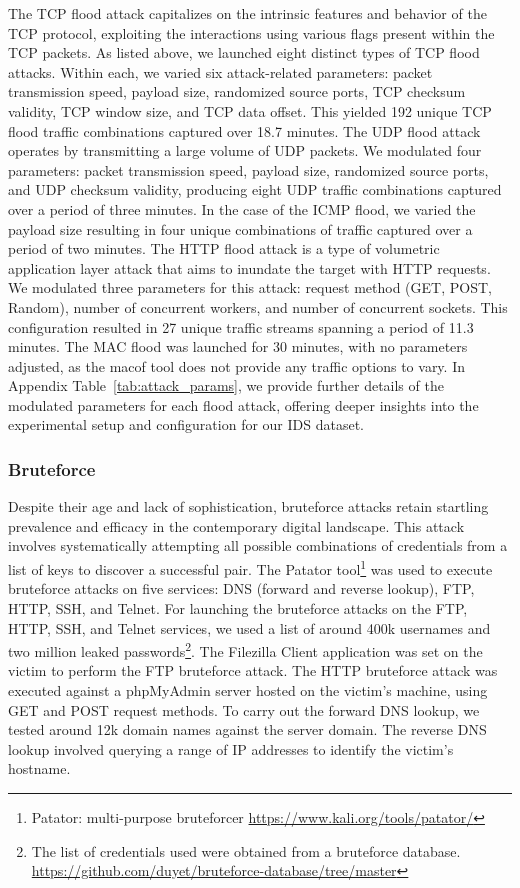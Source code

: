 \documentclass[lettersize,journal]{IEEEtran}
\begin{document}
The \ac{TCP} flood attack capitalizes on the intrinsic features and behavior of the \ac{TCP} protocol, exploiting the interactions using various flags present within the \ac{TCP} packets. As listed above, we launched eight distinct types of \ac{TCP} flood attacks. Within each, we varied six attack-related parameters: packet transmission speed, payload size, randomized source ports, \ac{TCP} checksum validity, \ac{TCP} window size, and \ac{TCP} data offset. This yielded 192 unique \ac{TCP} flood traffic combinations captured over 18.7 minutes. The UDP flood attack operates by transmitting a large volume of UDP packets. We modulated four parameters: packet transmission speed, payload size, randomized source ports, and UDP checksum validity, producing eight UDP traffic combinations captured over a period of three minutes. In the case of the \ac{ICMP} flood, we varied the payload size resulting in four unique combinations of traffic captured over a period of two minutes.  The \ac{HTTP} flood attack is a type of volumetric application layer attack that aims to inundate the target with \ac{HTTP} requests. We modulated three parameters for this attack: request method (GET, POST, Random), number of concurrent workers, and number of concurrent sockets. This configuration resulted in 27 unique traffic streams spanning a period of 11.3 minutes. The MAC flood was launched for 30 minutes, with no parameters adjusted, as the macof tool does not provide any traffic options to vary. In Appendix Table~\ref{tab:attack_params}, we provide further details of the modulated parameters for each flood attack, offering deeper insights into the experimental setup and configuration for our \ac{IDS} dataset. 


\subsubsection{Bruteforce}\label{sec:bruteforce}
Despite their age and lack of sophistication, bruteforce attacks retain startling prevalence and efficacy in the contemporary digital landscape. This attack involves systematically attempting all possible combinations of credentials from a list of keys to discover a successful pair. The Patator tool\footnote{Patator: multi-purpose bruteforcer \url{https://www.kali.org/tools/patator/}} was used to execute bruteforce attacks on five services: \ac{DNS} (forward and reverse lookup), \ac{FTP}, \ac{HTTP}, \ac{SSH}, and Telnet. For launching the bruteforce attacks on the \ac{FTP}, \ac{HTTP}, \ac{SSH}, and Telnet services, we used a list of around 400k usernames and two million leaked passwords\footnote{The list of credentials used were obtained from a bruteforce database. \url{https://github.com/duyet/bruteforce-database/tree/master}}. The Filezilla Client application was set on the victim to perform the FTP bruteforce attack. The HTTP bruteforce attack was executed against a phpMyAdmin server hosted on the victim's machine, using GET and POST request methods. To carry out the forward \ac{DNS} lookup, we tested around 12k domain names against the server domain. The reverse \ac{DNS} lookup involved querying a range of \ac{IP} addresses to identify the victim's hostname.
\end{document}
